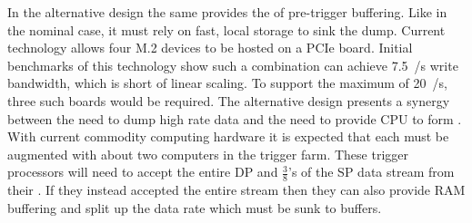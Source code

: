 In the alternative design the same  provides the
\snbpretime of pre-trigger  buffering. 
Like in the nominal case, it must rely on fast, local 
storage to sink the dump. 
Current  technology allows four M.2  devices to
be hosted on a PCIe board. 
Initial benchmarks of this technology show such a combination can
achieve \SI{7.5}{\GB/\s} write bandwidth, which is short of linear
scaling. 
To support the maximum of \SI{20}{\GB/\s}, three such boards would be
required.
The alternative design presents a synergy between the need to dump
high rate data and the need to provide CPU to form
. 
With current commodity computing hardware it is expected that each
 must be augmented with about two computers in the trigger
farm. 
These trigger processors will need to accept the entire DP and
$\frac{3}{8}$'s of the SP data stream from their . 
If they instead accepted the entire stream then they can also provide
RAM buffering and split up the data rate which must be sunk to
 buffers.


